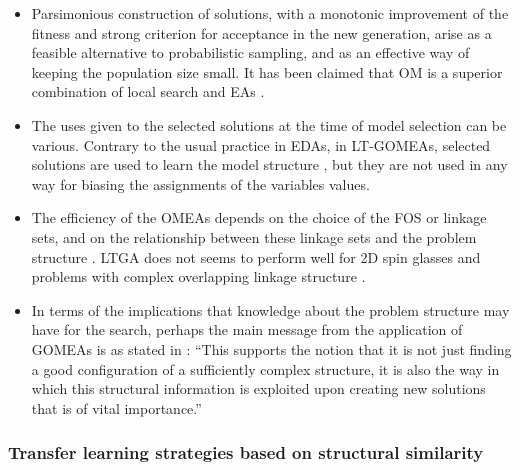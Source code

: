 \documentclass{article} %
\begin{document}
 \begin{itemize}
   \item Parsimonious construction of solutions, with a monotonic improvement of the fitness and strong criterion for acceptance in the new generation, arise as a feasible alternative to probabilistic sampling,  and as an effective way of keeping the population size small. It has been claimed that OM is a superior combination of local search and EAs \cite{Bosman_and_Thierens:2011}.
   \item The uses given to the  selected solutions at the time of model selection can be various. Contrary to the usual practice in EDAs, in LT-GOMEAs, selected solutions are used to learn the model structure \cite{Thierens_and_Bosman:2013}, but they are not used in any way for biasing  the assignments of the variables values.  
   \item  The efficiency of the OMEAs depends on the choice of the FOS or linkage sets, and on the relationship between these linkage sets and the problem structure \cite{Wang_et_al:2014}.  LTGA does not seems to perform well for 2D spin glasses \cite{Pelikan_et_al:2011} and problems with complex overlapping linkage structure \cite{Goldman_and_Tauritz:2012}.
   \item In terms of the implications that knowledge about the problem structure may have for the search, perhaps the main message from the application of GOMEAs is as stated in \cite{Thierens_and_Bosman:2011}: ``This supports the notion that it is not just finding a good configuration of a sufficiently complex structure, it is also the way in which this structural information is exploited upon creating new solutions that is of vital importance.''
 \end{itemize}





\subsubsection{Transfer learning strategies based on structural similarity}
\end{document}
